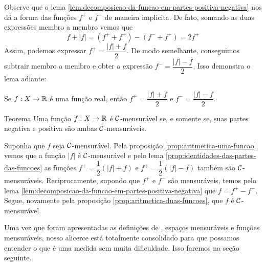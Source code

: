 Observe que o lema \ref{lem:decomposicao-da-funcao-em-partes-positiva-negativa} nos dá a forma das funções $f^+$ e $f^-$ de maneira implicita.
De fato, somando as duas expressões membro a membro vemos que 
$$f + |f| = (f^+ + f^+) - (f^- + f^-) = 2f^+$$
Assim, podemos expressar $f^+ = \dfrac{|f| + f}{2}$.
De modo semelhante, conseguimos subtrair membro a membro e obter a expressão $f^- = \dfrac{|f| - f}{2}$. 
Isso demonstra o lema adiante:

    \begin{lemma}
    \label{prop:identidades-das-partes-das-funcoes}
        Se $f: X \to \mathbb{R}$ é uma função real, então $f^+ = \dfrac{|f| + f}{2}$ e $f^- = \dfrac{|f| - f}{2}$.
    \end{lemma}
    \begin{resultado}{Teorema}
        Uma função $f: X \to \mathbb{R}$ é $\operatorname{\mathcal{C}}$-mensurável se, e somente se, suas partes negativa e positiva são ambas $\operatorname{\mathcal{C}}$-mensuráveis. 
    \end{resultado}

    \begin{prova}
        Suponha que $f$ seja $\operatorname{\mathcal{C}}$-mensurável.
        Pela proposição \ref{prop:aritmetica-uma-funcao} vemos que a função $|f|$ é $\operatorname{\mathcal{C}}$-mensurável e pelo lema \ref{prop:identidades-das-partes-das-funcoes} as funções $f^+ = \dfrac{1}{2}(|f| + f)$ e $f^+ = \dfrac{1}{2}(|f| - f)$ também são $\operatorname{\mathcal{C}}$-mensuráveis.
        Reciprocamente, supondo que $f^+$ e $f^-$ são mensuráveis, temos pelo lema \ref{lem:decomposicao-da-funcao-em-partes-positiva-negativa} que
        $f = f^+ - f^-$. Segue, novamente pela proposição \ref{prop:aritmetica-duas-funcoes}, que $f$ é $\operatorname{\mathcal{C}}$-mensurável. 
    \end{prova}

Uma vez que foram apresentadas as definições de \sigal\hspace{-0.1cm}, espaços mensuráveis e funções mensuráveis, nosso alicerce está totalmente consolidado para que possamos entender o que é uma medida sem muita dificuldade.
Isso faremos na seção seguinte.
